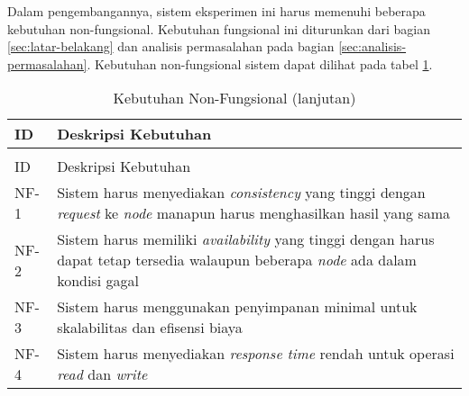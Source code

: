 Dalam pengembangannya, sistem eksperimen ini harus memenuhi beberapa kebutuhan non-fungsional. Kebutuhan fungsional ini diturunkan dari bagian \ref{sec:latar-belakang} dan analisis permasalahan pada bagian \ref{sec:analisis-permasalahan}. Kebutuhan non-fungsional sistem dapat dilihat pada tabel \ref{tab:non-functional-requirements}.

\begin{longtable}{|l|p{13cm}|}
\caption{Kebutuhan Non-Fungsional}
\label{tab:non-functional-requirements} \\
\hline
\rowcolor{black!10} ID & Deskripsi Kebutuhan \\ \hline
\endfirsthead

\caption[]{Kebutuhan Non-Fungsional (lanjutan)} \\
\hline
\rowcolor{black!10} ID & Deskripsi Kebutuhan \\ \hline
\endhead

NF-1 & Sistem harus menyediakan \textit{consistency} yang tinggi dengan \textit{request} ke \textit{node} manapun harus menghasilkan hasil yang sama \\ \hline
NF-2 & Sistem harus memiliki \textit{availability} yang tinggi dengan harus dapat tetap tersedia walaupun beberapa \textit{node} ada dalam kondisi gagal \\ \hline
NF-3 & Sistem harus menggunakan penyimpanan minimal untuk skalabilitas dan efisensi biaya \\ \hline
NF-4 & Sistem harus menyediakan \textit{response time} rendah untuk operasi \textit{read} dan \textit{write} \\ \hline
\end{longtable}